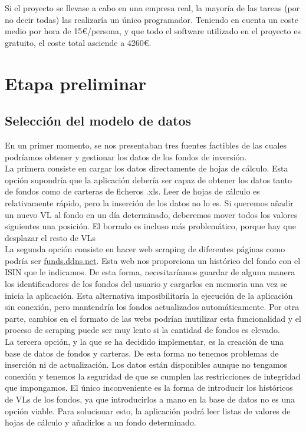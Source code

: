 \documentclass[12pt, a4paper]{book}
\begin{document}
Si el proyecto se llevase a cabo en una empresa real, la mayoría de las tareas (por no decir todas) las realizaría un único programador. Teniendo en cuenta un coste medio por hora de 15€/persona, y que todo el software utilizado en el proyecto es gratuito, el coste total asciende a 4260€.


\newpage
\chapter{Etapa preliminar}

\section{Selección del modelo de datos}

En un primer momento, se nos presentaban tres fuentes factibles de las cuales podríamos obtener y gestionar los datos de los fondos de inversión.\\

La primera consiste en cargar los datos directamente de hojas de cálculo. Esta opción supondría que la aplicación debería ser capaz de obtener los datos tanto de fondos como de carteras de ficheros .xls. Leer de hojas de cálculo es relativamente rápido, pero la inserción de los datos no lo es. Si queremos añadir un nuevo \gls{VL} al fondo en un día determinado, deberemos mover todos los valores siguientes una posición. El borrado es incluso más problemático, porque hay que desplazar el resto de \gls{VL}s\\

La segunda opción consiste en hacer web scraping de diferentes páginas como podría ser \href{https://funds.ddns.net/}{funds.ddns.net}. Esta web nos proporciona un histórico del fondo con el ISIN que le indicamos. De esta forma, necesitaríamos guardar de alguna manera los identificadores de los fondos del usuario y cargarlos en memoria una vez se inicia la aplicación. Esta alternativa imposibilitaría la ejecución de la aplicación sin conexión, pero mantendría los fondos actualizados automáticamente. Por otra parte, cambios en el formato de las webs podrían inutilizar esta funcionalidad y el proceso de scraping puede ser muy lento si la cantidad de fondos es elevado.\\

La tercera opción, y la que se ha decidido implementar, es la creación de una base de datos de fondos y carteras. De esta forma no tenemos problemas de inserción ni de actualización. Los datos están disponibles aunque no tengamos conexión y tenemos la seguridad de que se cumplen las restricciones de integridad que impongamos. El único inconveniente es la forma de introducir los históricos de \gls{VL}s de los fondos, ya que introducirlos a mano en la base de datos no es una opción viable. Para solucionar esto, la aplicación podrá leer listas de valores de hojas de cálculo y añadirlos a un fondo determinado.
\end{document}

